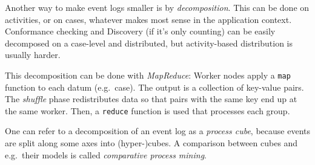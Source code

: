\documentclass[english]{panikzettel}
\begin{document}
Another way to make event logs smaller is by \emph{decomposition}.
This can be done on activities, or on cases, whatever makes most sense in the application context.
Conformance checking and Discovery (if it's only counting) can be easily decomposed on a case-level and distributed, but activity-based distribution is usually harder.

This decomposition can be done with \emph{MapReduce}: Worker nodes apply a \texttt{map} function to each datum (e.g.\ case).
The output is a collection of key-value pairs.
The \emph{shuffle} phase redistributes data so that pairs with the same key end up at the same worker.
Then, a \texttt{reduce} function is used that processes each group.

One can refer to a decomposition of an event log as a \emph{process cube}, because events are split along some axes into (hyper-)cubes.
A comparison between cubes and e.g.\ their models is called \emph{comparative process mining}.
\end{document}
